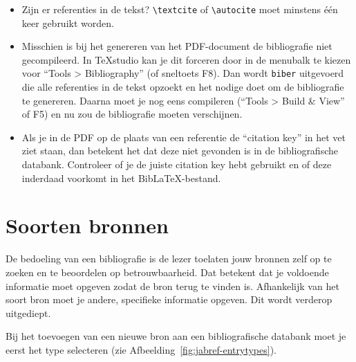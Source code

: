 \begin{itemize}
  \item Zijn er referenties in de tekst? \verb|\textcite| of \verb|\autocite| moet minstens één keer gebruikt worden.
  \item Misschien is bij het genereren van het PDF-document de bibliografie niet gecompileerd. In {\TeX}studio kan je dit forceren door in de menubalk te kiezen voor ``Tools > Bibliography'' (of sneltoets F8). Dan wordt \texttt{biber} uitgevoerd die alle referenties in de tekst opzoekt en het nodige doet om de bibliografie te genereren. Daarna moet je nog eens compileren (``Tools > Build \& View'' of F5) en nu zou de bibliografie moeten verschijnen.
  \item Als je in de PDF op de plaats van een referentie de ``citation key'' in het vet ziet staan, dan betekent het dat deze niet gevonden is in de bibliografische databank. Controleer of je de juiste citation key hebt gebruikt en of deze inderdaad voorkomt in het Bib{\LaTeX}-bestand.
\end{itemize} 

\section{Soorten bronnen}%
\label{sec:soorten_bronnen}

De bedoeling van een bibliografie is de lezer toelaten jouw bronnen zelf op te zoeken en te beoordelen op betrouwbaarheid. Dat betekent dat je voldoende informatie moet opgeven zodat de bron terug te vinden is. Afhankelijk van het soort bron moet je andere, specifieke informatie opgeven. Dit wordt verderop uitgediept.

Bij het toevoegen van een nieuwe bron aan een bibliografische databank moet je eerst het type selecteren (zie Afbeelding~\ref{fig:jabref-entrytypes}).

